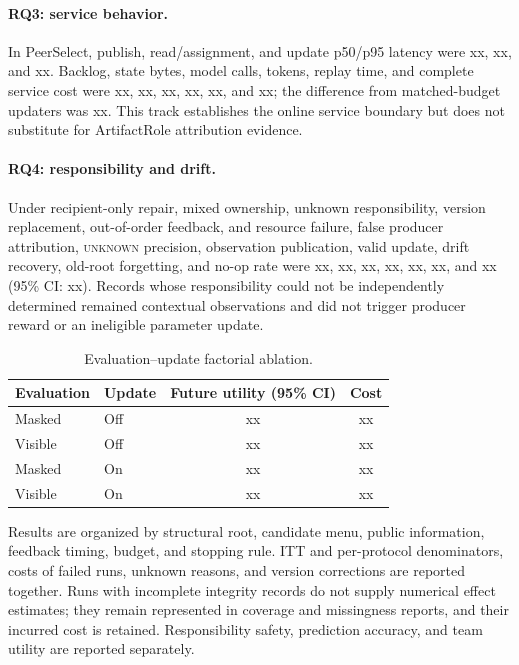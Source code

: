 \documentclass[sigconf,anonymous]{aamas}
\newcommand{\unknown}{\textsc{unknown}}
\begin{document}
\paragraph{RQ3: service behavior.} In PeerSelect, publish, read/assignment, and update p50/p95 latency were xx, xx, and xx. Backlog, state bytes, model calls, tokens, replay time, and complete service cost were xx, xx, xx, xx, xx, and xx; the difference from matched-budget updaters was xx. This track establishes the online service boundary but does not substitute for ArtifactRole attribution evidence.

\paragraph{RQ4: responsibility and drift.} Under recipient-only repair, mixed ownership, unknown responsibility, version replacement, out-of-order feedback, and resource failure, false producer attribution, \unknown{} precision, observation publication, valid update, drift recovery, old-root forgetting, and no-op rate were xx, xx, xx, xx, xx, xx, and xx (95\% CI: xx). Records whose responsibility could not be independently determined remained contextual observations and did not trigger producer reward or an ineligible parameter update.

\begin{table}[t]
\centering\small
\setlength{\tabcolsep}{3pt}
\begin{tabular}{llcc}
\toprule
Evaluation & Update & Future utility (95\% CI) & Cost \\
\midrule
Masked & Off & xx & xx \\
Visible & Off & xx & xx \\
Masked & On & xx & xx \\
Visible & On & xx & xx \\
\bottomrule
\end{tabular}
\caption{Evaluation--update factorial ablation.}
\label{tab:factorial-results}
\end{table}

Results are organized by structural root, candidate menu, public information, feedback timing, budget, and stopping rule. ITT and per-protocol denominators, costs of failed runs, unknown reasons, and version corrections are reported together. Runs with incomplete integrity records do not supply numerical effect estimates; they remain represented in coverage and missingness reports, and their incurred cost is retained. Responsibility safety, prediction accuracy, and team utility are reported separately.
\end{document}
